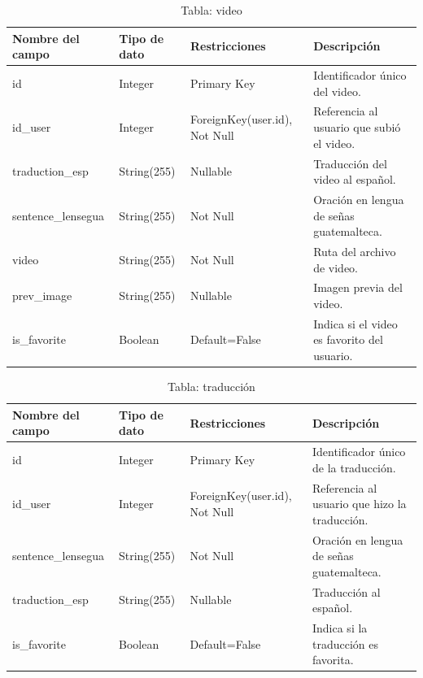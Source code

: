 \begin{table}[H]
\centering
\begin{tabularx}{\textwidth}{|l|l|l|X|}
\hline
\textbf{Nombre del campo} & \textbf{Tipo de dato} & \textbf{Restricciones} & \textbf{Descripción} \\ \hline
id                       & Integer               & Primary Key            & Identificador único del video. \\ \hline
id\_user                 & Integer               & ForeignKey(user.id), Not Null & Referencia al usuario que subió el video. \\ \hline
traduction\_esp          & String(255)           & Nullable                & Traducción del video al español. \\ \hline
sentence\_lensegua       & String(255)           & Not Null                & Oración en lengua de señas guatemalteca. \\ \hline
video                    & String(255)           & Not Null                & Ruta del archivo de video. \\ \hline
prev\_image              & String(255)           & Nullable                & Imagen previa del video. \\ \hline
is\_favorite             & Boolean               & Default=False           & Indica si el video es favorito del usuario. \\ \hline
\end{tabularx}
\caption{Tabla: video}
\end{table}

\begin{table}[H]
\centering
\begin{tabularx}{\textwidth}{|l|l|l|X|}
\hline
\textbf{Nombre del campo} & \textbf{Tipo de dato} & \textbf{Restricciones} & \textbf{Descripción} \\ \hline
id                       & Integer               & Primary Key            & Identificador único de la traducción. \\ \hline
id\_user                 & Integer               & ForeignKey(user.id), Not Null & Referencia al usuario que hizo la traducción. \\ \hline
sentence\_lensegua       & String(255)           & Not Null                & Oración en lengua de señas guatemalteca. \\ \hline
traduction\_esp          & String(255)           & Nullable                & Traducción al español. \\ \hline
is\_favorite             & Boolean               & Default=False           & Indica si la traducción es favorita. \\ \hline
\end{tabularx}
\caption{Tabla: traducción}
\end{table}

